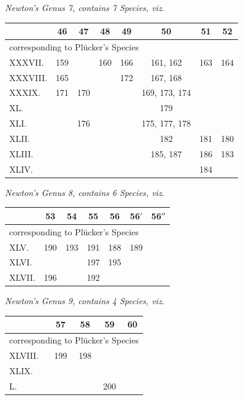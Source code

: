 \documentclass[11pt]{article}
\begin{document}
\medskip
\noindent\emph{Newton's Genus 7, contains 7 Species, viz.}
\begin{center}\small
\begin{tabular}{|l|c|c|c|c|c|c|c|}\hline
& 46 & 47 & 48 & 49 & 50 & 51 & 52 \\\hline
\multicolumn{8}{|l|}{\quad corresponding to Pl\"ucker's Species}\\\hline
XXXVII.   & 159 &     & 160 & 166 & 161, 162 & 163 & 164 \\\hline
XXXVIII.  & 165 &     &     & 172 & 167, 168 &     &     \\\hline
XXXIX.    & 171 & 170 &     &     & 169, 173, 174 &     &     \\\hline
XL.       &     &     &     &     & 179      &     &     \\\hline
XLI.      &     & 176 &     &     & 175, 177, 178 &     &     \\\hline
XLII.     &     &     &     &     & 182      & 181 & 180 \\\hline
XLIII.    &     &     &     &     & 185, 187 & 186 & 183 \\\hline
XLIV.     &     &     &     &     &          & 184 &     \\\hline
\end{tabular}
\end{center}

\medskip
\noindent\emph{Newton's Genus 8, contains 6 Species, viz.}
\begin{center}\small
\begin{tabular}{|l|c|c|c|c|c|c|}\hline
& 53 & 54 & 55 & 56 & 56$'$ & 56$''$ \\\hline
\multicolumn{7}{|l|}{\quad corresponding to Pl\"ucker's Species}\\\hline
XLV.    & 190 & 193 & 191 & 188 & 189 &     \\\hline
XLVI.   &     &     & 197 & 195 &     &     \\\hline
XLVII.  & 196 &     & 192 &     &     &     \\\hline
\end{tabular}
\end{center}

\medskip
\noindent\emph{Newton's Genus 9, contains 4 Species, viz.}
\begin{center}\small
\begin{tabular}{|l|c|c|c|c|}\hline
& 57 & 58 & 59 & 60 \\\hline
\multicolumn{5}{|l|}{\quad corresponding to Pl\"ucker's Species}\\\hline
XLVIII.  & 199 & 198 &     &     \\\hline
XLIX.    &     &     &     &     \\\hline
L.       &     &     & 200 &     \\\hline
\end{tabular}
\end{center}
\end{document}
